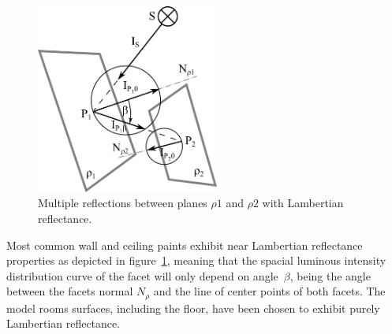 \begin{figure}[htb]
  \centering
  \includegraphics[width=170pt]{diffuseReflection}
  \caption{Multiple reflections between planes $\rho1$ and $\rho2$ with Lambertian reflectance.}
  \label{fig:difRefl}
\end{figure}

Most common wall and ceiling paints exhibit near Lambertian reflectance properties as depicted in figure~\ref{fig:difRefl}, meaning that the spacial luminous intensity distribution curve of the facet will only depend on angle~$\beta$, being the angle between the facets normal $N_{\rho}$ and the line of center points of both facets. The model rooms surfaces, including the floor, have been chosen to exhibit purely Lambertian reflectance.




